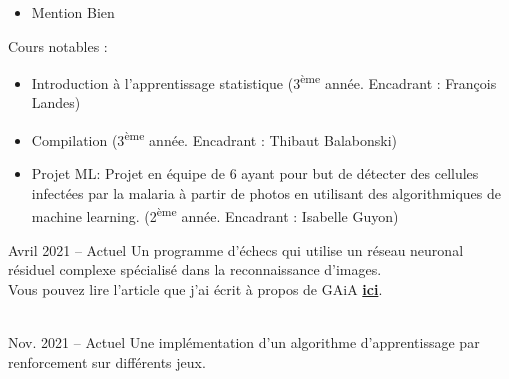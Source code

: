 \documentclass[10pt,a4paper,ragged2e,withhyper]{altacv}
\begin{document}
\begin{paracol}{2}
            \begin{itemize}
                \item Mention Bien
            \end{itemize}

            Cours notables :
            \vspace{2pt}
            \begin{itemize}
                \item Introduction à l'apprentissage statistique (3\textsuperscript{ème} année. Encadrant : François Landes)
                \item Compilation (3\textsuperscript{ème} année. Encadrant : Thibaut Balabonski)
                \item Projet ML: Projet en équipe de 6 ayant pour but de détecter des cellules infectées par la malaria à partir de photos
                      en utilisant des algorithmiques de machine learning.
                      (2\textsuperscript{ème} année. Encadrant : Isabelle Guyon)
            \end{itemize}
            

        \pagebreak

            {Avril 2021 -- Actuel}{}
            Un programme d'échecs qui utilise un réseau neuronal résiduel complexe spécialisé dans la reconnaissance d'images.\\
            Vous pouvez lire l'article que j'ai écrit à propos de GAiA
            \href{https://raw.githubusercontent.com/Plagiat01/GAiA/master/article/Performing%20Regression%20on%20Complex%20Data.pdf}
            {\textbf{ici}}.\\
            \vspace{4pt}
            \\
            \vspace{4pt}
            \divider

            {Nov. 2021 -- Actuel}{}
            Une implémentation d'un algorithme d'apprentissage par renforcement
            sur différents jeux.\\
            \vspace{4pt}
            \\
            \vspace{4pt}
            \divider
            


\end{paracol}
\end{document}
